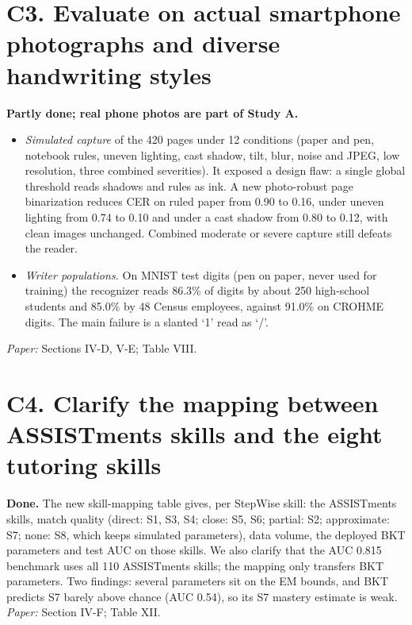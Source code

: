\documentclass[10pt]{article}
\begin{document}
\section*{C3. Evaluate on actual smartphone photographs and diverse handwriting styles}
\textbf{Partly done; real phone photos are part of Study A.}
\begin{itemize}
\item \textit{Simulated capture} of the 420 pages under 12 conditions (paper and pen, notebook rules,
uneven lighting, cast shadow, tilt, blur, noise and JPEG, low resolution, three combined
severities). It exposed a design flaw: a single global threshold reads shadows and rules as ink.
A new photo-robust page binarization reduces CER on ruled paper from 0.90 to 0.16, under uneven
lighting from 0.74 to 0.10 and under a cast shadow from 0.80 to 0.12, with clean images unchanged.
Combined moderate or severe capture still defeats the reader.
\item \textit{Writer populations.} On MNIST test digits (pen on paper, never used for training) the
recognizer reads 86.3\% of digits by about 250 high-school students and 85.0\% by 48 Census
employees, against 91.0\% on CROHME digits. The main failure is a slanted `1' read as `/'.
\end{itemize}
\textit{Paper:} Sections IV-D, V-E; Table VIII.

\section*{C4. Clarify the mapping between ASSISTments skills and the eight tutoring skills}
\textbf{Done.} The new skill-mapping table gives, per StepWise skill: the ASSISTments skills, match
quality (direct: S1, S3, S4; close: S5, S6; partial: S2; approximate: S7; none: S8, which keeps
simulated parameters), data volume, the deployed BKT parameters and test AUC on those skills. We
also clarify that the AUC 0.815 benchmark uses all 110 ASSISTments skills; the mapping only
transfers BKT parameters. Two findings: several parameters sit on the EM bounds, and BKT predicts S7
barely above chance (AUC 0.54), so its S7 mastery estimate is weak.
\textit{Paper:} Section IV-F; Table XII.
\end{document}
